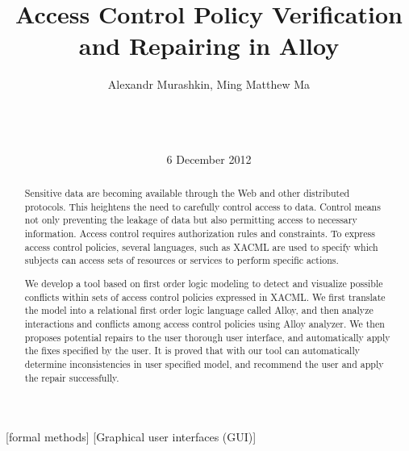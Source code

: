 \documentclass{acm_proc_article-sp}
\begin{document}
\title{Access Control Policy Verification and Repairing in Alloy}


\author{
\alignauthor Alexandr Murashkin, Ming Matthew Ma \\
       \\
       \\
       \\
}
\date{6 December 2012}
\maketitle

\begin{abstract}
Sensitive data are becoming available through the Web and other distributed protocols. This heightens the need to carefully control access to data. Control means not only preventing the leakage of data but also permitting access to necessary information. Access control requires authorization rules and constraints. To express access control policies, several languages,
such as XACML are used to specify which subjects can  access sets of resources
or services to perform specific actions. 

We develop a tool based on first order logic modeling to detect and visualize possible conflicts within sets of access control policies expressed in XACML. We first translate the model
into a relational first order logic language called Alloy, and then analyze interactions
and conflicts among access control policies using Alloy analyzer. We then proposes potential repairs to the user thorough user interface, and automatically apply the fixes specified by the user. It is proved that with our tool can automatically determine inconsistencies in user specified model, and recommend the user and apply the repair successfully. 

\end{abstract}

[formal methods]
[Graphical user interfaces (GUI)]


\end{document}
